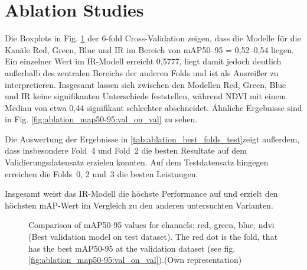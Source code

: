 \section{Ablation Studies}
Die Boxplots in Fig. \ref{fig:ablation_map50-95:val_on_test} der 6-fold Cross-Validation zeigen, dass die Modelle für die Kanäle Red, Green, Blue und IR im Bereich von mAP50–95 = 0,52–0,54 liegen. Ein einzelner Wert im IR-Modell erreicht 0,5777, liegt damit jedoch deutlich außerhalb des zentralen Bereichs der anderen Folds und ist als Ausreißer zu interpretieren. Insgesamt lassen sich zwischen den Modellen Red, Green, Blue und IR keine signifikanten Unterschiede feststellen, während NDVI mit einem Median von etwa 0,44 signifikant schlechter abschneidet. Ähnliche Ergebnisse sind in Fig. \ref{fig:ablation_map50-95:val_on_val} zu sehen.

Die Auswertung der Ergebnisse in \ref{tab:ablation_best_folds_test}zeigt außerdem, dass insbesondere Fold~4 und Fold~2 die besten Resultate auf dem Validierungsdatensatz erzielen konnten. Auf dem Testdatensatz hingegen erreichen die Folds~0, 2 und~3 die besten Leistungen.  

Insgesamt weist das IR-Modell die höchste Performance auf und erzielt den höchsten \acrshort{mAP}-Wert im Vergleich zu den anderen untersuchten Varianten.  




\begin{figure}[htbp]
    \centering
    
    \caption[Comparison of \acrshort{mAP}50-95 values for channels: red, green, blue, ndvi (Best validation model on test dataset)]{Comparison of \acrshort{mAP}50-95 values for channels: red, green, blue, ndvi (Best validation model on test dataset). The red dot is the fold, that has the best \acrshort{mAP}50-95 at the validation dataset (see fig. \ref{fig:ablation_map50-95:val_on_val}).(Own representation)}
    \label{fig:ablation_map50-95:val_on_test}
\end{figure}


